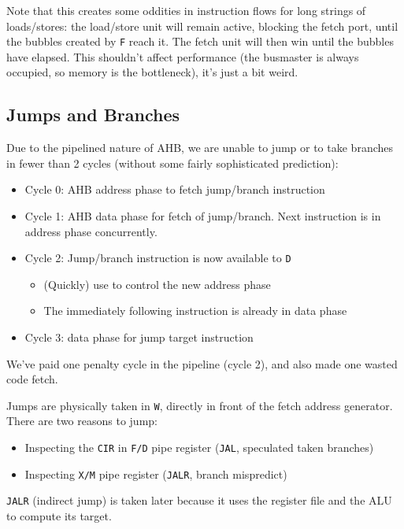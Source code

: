 \documentclass{article}
\begin{document}
Note that this creates some oddities in instruction flows for long strings of loads/stores: the load/store unit will remain active, blocking the fetch port, until the bubbles created by \texttt{F} reach it. The fetch unit will then win until the bubbles have elapsed. This shouldn't affect performance (the busmaster is always occupied, so memory is the bottleneck), it's just a bit weird.


\subsection{Jumps and Branches}

Due to the pipelined nature of AHB, we are unable to jump or to take branches in fewer than 2 cycles (without some fairly sophisticated prediction):

\begin{itemize}
\item Cycle 0: AHB address phase to fetch jump/branch instruction
\item Cycle 1: AHB data phase for fetch of jump/branch. Next instruction is in address phase concurrently.
\item Cycle 2: Jump/branch instruction is now available to \texttt{D}
	\begin{itemize}
		\item (Quickly) use to control the new address phase
		\item The immediately following instruction is already in data phase
	\end{itemize}
\item Cycle 3: data phase for jump target instruction
\end{itemize}


We've paid one penalty cycle in the pipeline (cycle 2), and also made one wasted code fetch.

Jumps are physically taken in \texttt{W}, directly in front of the fetch address generator. There are two reasons to jump:

\begin{itemize}
	\item Inspecting the \texttt{CIR} in \texttt{F/D} pipe register (\texttt{JAL}, speculated taken branches)
	\item Inspecting \texttt{X/M} pipe register (\texttt{JALR}, branch mispredict)
\end{itemize}

\texttt{JALR} (indirect jump) is taken later because it uses the register file and the ALU to compute its target.
\end{document}
